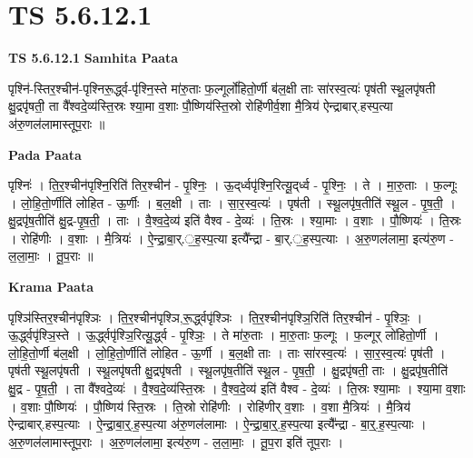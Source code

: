 \documentclass[17pt]{extarticle}
\begin{document}
\section{ TS 5.6.12.1 }

\textbf{TS 5.6.12.1 } \newline
\textbf{Samhita Paata} \newline

पृश्नि॑-स्तिर॒श्चीन॑-पृश्निरू॒र्द्ध्व-पृ॑श्नि॒स्ते मा॑रु॒ताः फ॒ल्गूर्लो॑हितो॒र्णी ब॑ल॒क्षी ताः सा॑रस्व॒त्यः॑ पृष॑ती स्थू॒लपृ॑षती क्षु॒द्रपृ॑षती॒ ता वै᳚श्वदे॒व्य॑स्ति॒स्रः श्या॒मा व॒शाः पौ॒ष्णिय॑स्ति॒स्रो रोहि॑णीर्व॒शा मै॒त्रिय॑ ऐन्द्राबार्.हस्प॒त्या अ॑रु॒णल॑लामास्तूप॒राः ॥ \newline

\textbf{Pada Paata} \newline

पृश्निः॑ । ति॒र॒श्चीन॑पृश्नि॒रिति॑ तिर॒श्चीन॑ - पृ॒श्निः॒ । ऊ॒द्‌र्ध्वपृ॑श्नि॒रित्यू॒द्‌र्ध्व - पृ॒श्निः॒ । ते । मा॒रु॒ताः । फ॒ल्गूः । लो॒हि॒तो॒र्णीति॑ लोहित - ऊ॒र्णीः । ब॒ल॒क्षी । ताः । सा॒र॒स्व॒त्यः॑ । पृष॑ती । स्थू॒लपृ॑ष॒तीति॑ स्थू॒ल - पृ॒ष॒ती॒ । क्षु॒द्रपृ॑ष॒तीति॑ क्षु॒द्र-पृ॒ष॒ती॒ । ताः । वै॒श्व॒दे॒व्य॑ इति॑ वैश्व - दे॒व्यः॑ । ति॒स्रः । श्या॒माः । व॒शाः । पौ॒ष्णियः॑ । ति॒स्रः । रोहि॑णीः । व॒शाः । मै॒त्रियः॑ । ऐ॒न्द्रा॒बा॒र्.॒ह॒स्प॒त्या इत्यै᳚न्द्रा - बा॒र्.॒ह॒स्प॒त्याः । अ॒रु॒णल॑लामा॒ इत्य॑रु॒ण - ल॒ला॒माः॒ । तू॒प॒राः ॥  \newline


\textbf{Krama Paata} \newline

पृश्ञि॑स्तिर॒श्चीन॑पृश्ञिः । ति॒र॒श्चीन॑पृश्ञि,रू॒र्द्ध्वपृ॑श्ञिः । ति॒र॒श्चीन॑पृश्ञि॒रिति॑ तिर॒श्चीन॑ - पृ॒श्ञिः॒ । ऊ॒र्द्ध्वपृ॑श्ञि॒स्ते । ऊ॒र्द्ध्वपृ॑श्ञि॒रित्यू॒र्द्ध्व - पृ॒श्ञिः॒ । ते मा॑रु॒ताः । मा॒रु॒ताः फ॒ल्गूः । फ॒ल्गूर् लो॑हितो॒र्णी । लो॒हि॒तो॒र्णी ब॑ल॒क्षी । लो॒हि॒तो॒र्णीति॑ लोहित - ऊ॒र्णी । ब॒ल॒क्षी ताः । ताः सा॑रस्व॒त्यः॑ । सा॒र॒स्व॒त्यः॑ पृष॑ती । पृष॑ती स्थू॒लपृ॑षती । स्थू॒लपृ॑षती क्षु॒द्रपृ॑षती । स्थू॒लपृ॑ष॒तीति॑ स्थू॒ल - पृ॒ष॒ती॒ । क्षु॒द्रपृ॑षती॒ ताः । क्षु॒द्रपृ॑ष॒तीति॑ क्षु॒द्र - पृ॒ष॒ती॒ । ता वै᳚श्वदे॒व्यः॑ । वै॒श्व॒दे॒व्य॑स्ति॒स्रः । वै॒श्व॒दे॒व्य॑ इति॑ वैश्व - दे॒व्यः॑ । ति॒स्रः श्या॒माः । श्या॒मा व॒शाः । व॒शाः पौ॒ष्णियः॑ । पौ॒ष्णिय॑ स्ति॒स्रः । ति॒स्रो रोहि॑णीः । रोहि॑णीर् व॒शाः । व॒शा मै॒त्रियः॑ । मै॒त्रिय॑ ऐन्द्राबार्.हस्प॒त्याः । ऐ॒न्द्रा॒बा॒र्॒.ह॒स्प॒त्या अ॑रु॒णल॑लामाः । ऐ॒न्द्रा॒बा॒र्॒.ह॒स्प॒त्या इत्यै᳚न्द्रा - बा॒र्॒.ह॒स्प॒त्याः । अ॒रु॒णल॑लामास्तूप॒राः । अ॒रु॒णल॑लामा॒ इत्य॑रु॒ण - ल॒ला॒माः॒ । तू॒प॒रा इति॑ तूप॒राः । \newline
\end{document}
